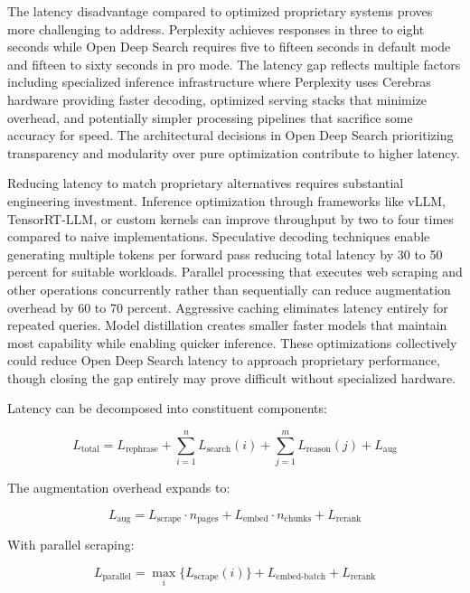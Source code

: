 The latency disadvantage compared to optimized proprietary systems proves more challenging to address. Perplexity achieves responses in three to eight seconds while Open Deep Search requires five to fifteen seconds in default mode and fifteen to sixty seconds in pro mode. The latency gap reflects multiple factors including specialized inference infrastructure where Perplexity uses Cerebras hardware providing faster decoding, optimized serving stacks that minimize overhead, and potentially simpler processing pipelines that sacrifice some accuracy for speed. The architectural decisions in Open Deep Search prioritizing transparency and modularity over pure optimization contribute to higher latency.

Reducing latency to match proprietary alternatives requires substantial engineering investment. Inference optimization through frameworks like vLLM, TensorRT-LLM, or custom kernels can improve throughput by two to four times compared to naive implementations. Speculative decoding techniques enable generating multiple tokens per forward pass reducing total latency by 30 to 50 percent for suitable workloads. Parallel processing that executes web scraping and other operations concurrently rather than sequentially can reduce augmentation overhead by 60 to 70 percent. Aggressive caching eliminates latency entirely for repeated queries. Model distillation creates smaller faster models that maintain most capability while enabling quicker inference. These optimizations collectively could reduce Open Deep Search latency to approach proprietary performance, though closing the gap entirely may prove difficult without specialized hardware.

Latency can be decomposed into constituent components:

\begin{equation}
L_{\text{total}} = L_{\text{rephrase}} + \sum_{i=1}^{n} L_{\text{search}}(i) + \sum_{j=1}^{m} L_{\text{reason}}(j) + L_{\text{aug}}
\label{eq:latency_decomposition}
\end{equation}

The augmentation overhead expands to:

\begin{equation}
L_{\text{aug}} = L_{\text{scrape}} \cdot n_{\text{pages}} + L_{\text{embed}} \cdot n_{\text{chunks}} + L_{\text{rerank}}
\label{eq:augmentation_latency}
\end{equation}

With parallel scraping:

\begin{equation}
L_{\text{parallel}} = \max_{i} \{L_{\text{scrape}}(i)\} + L_{\text{embed-batch}} + L_{\text{rerank}}
\label{eq:parallel_latency}
\end{equation}


